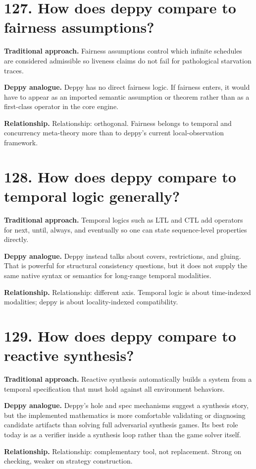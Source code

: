 \documentclass[11pt,openany]{book}
\begin{document}
\section*{127. How does deppy compare to fairness assumptions?}
\textbf{Traditional approach.} Fairness assumptions control which infinite schedules are considered admissible so liveness claims do not fail for pathological starvation traces.

\textbf{Deppy analogue.} Deppy has no direct fairness logic. If fairness enters, it would have to appear as an imported semantic assumption or theorem rather than as a first-class operator in the core engine.

\textbf{Relationship.} Relationship: orthogonal. Fairness belongs to temporal and concurrency meta-theory more than to deppy's current local-observation framework.

\section*{128. How does deppy compare to temporal logic generally?}
\textbf{Traditional approach.} Temporal logics such as LTL and CTL add operators for next, until, always, and eventually so one can state sequence-level properties directly.

\textbf{Deppy analogue.} Deppy instead talks about covers, restrictions, and gluing. That is powerful for structural consistency questions, but it does not supply the same native syntax or semantics for long-range temporal modalities.

\textbf{Relationship.} Relationship: different axis. Temporal logic is about time-indexed modalities; deppy is about locality-indexed compatibility.

\section*{129. How does deppy compare to reactive synthesis?}
\textbf{Traditional approach.} Reactive synthesis automatically builds a system from a temporal specification that must hold against all environment behaviors.

\textbf{Deppy analogue.} Deppy's hole and spec mechanisms suggest a synthesis story, but the implemented mathematics is more comfortable validating or diagnosing candidate artifacts than solving full adversarial synthesis games. Its best role today is as a verifier inside a synthesis loop rather than the game solver itself.

\textbf{Relationship.} Relationship: complementary tool, not replacement. Strong on checking, weaker on strategy construction.
\end{document}
